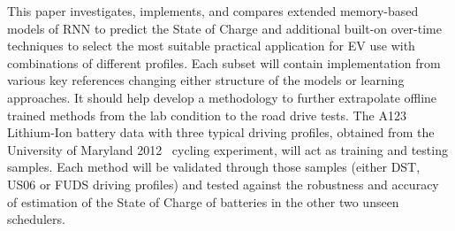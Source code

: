 %
%
%
%
%
This paper investigates, implements, and compares extended memory-based models of RNN to predict the State of Charge and additional built-on over-time techniques to select the most suitable practical application for EV use with combinations of different profiles.
Each subset will contain implementation from various key references changing either structure of the models or learning approaches.
It should help develop a methodology to further extrapolate offline trained methods from the lab condition to the road drive tests.
The A123 Lithium-Ion battery data with three typical driving profiles, obtained from the University of Maryland 2012~\cite{noauthor_calce_2017} cycling experiment, will act as training and testing samples.
Each method will be validated through those samples (either DST, US06 or FUDS driving profiles) and tested against the robustness and accuracy of estimation of the State of Charge of batteries in the other two unseen schedulers.

